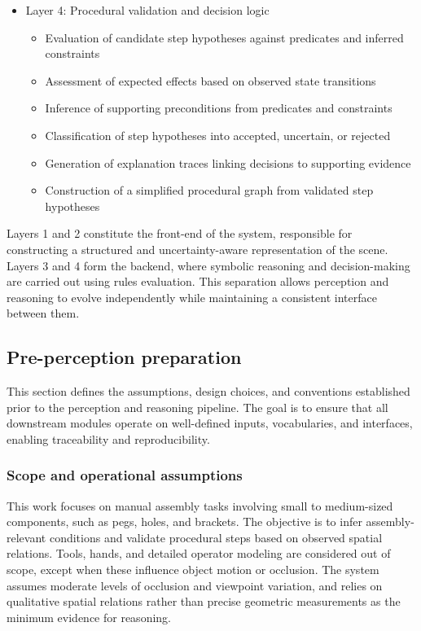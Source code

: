 \documentclass[11pt,titlepage,openright]{book}
\begin{document}
\begin{itemize}
  \item Layer 4: Procedural validation and decision logic
  \begin{itemize}
    \item Evaluation of candidate step hypotheses against predicates and inferred constraints
    \item Assessment of expected effects based on observed state transitions
    \item Inference of supporting preconditions from predicates and constraints
    \item Classification of step hypotheses into accepted, uncertain, or rejected
    \item Generation of explanation traces linking decisions to supporting evidence
    \item Construction of a simplified procedural graph from validated step hypotheses
  \end{itemize}

\end{itemize}

Layers 1 and 2 constitute the front-end of the system, responsible for constructing a structured and uncertainty-aware representation of the scene. Layers 3 and 4 form the backend, where symbolic reasoning and decision-making are carried out using rules evaluation. This separation allows perception and reasoning to evolve independently while maintaining a consistent interface between them.

\subsection{Pre-perception preparation}
\label{sec:pre-perception}

This section defines the assumptions, design choices, and conventions established prior to the perception and reasoning pipeline. The goal is to ensure that all downstream modules operate on well-defined inputs, vocabularies, and interfaces, enabling traceability and reproducibility.

\subsubsection{Scope and operational assumptions}
\label{sec:scope-assumptions}
This work focuses on manual assembly tasks involving small to medium-sized components, such as pegs, holes, and brackets. The objective is to infer assembly-relevant conditions and validate procedural steps based on observed spatial relations. Tools, hands, and detailed operator modeling are considered out of scope, except when these influence object motion or occlusion. The system assumes moderate levels of occlusion and viewpoint variation, and relies on qualitative spatial relations rather than precise geometric measurements as the minimum evidence for reasoning.
\end{document}
